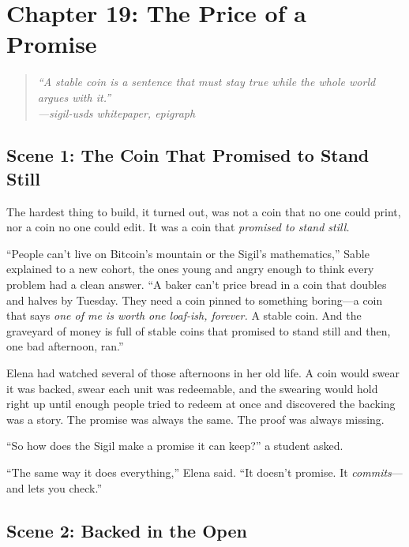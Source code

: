 \documentclass[12pt,letterpaper]{book}
\begin{document}
\hypertarget{chapter-19-the-price-of-a-promise}{%
\section{Chapter 19: The Price of a
Promise}\label{chapter-19-the-price-of-a-promise}}

\begin{quote}
\itshape ``A stable coin is a sentence that must stay true while the whole world
argues with it.''\\
\normalfont\hfill---sigil-usds whitepaper, epigraph
\end{quote}

\hypertarget{scene-1-the-coin-that-promised-to-stand-still}{%
\subsection{Scene 1: The Coin That Promised to Stand
Still}\label{scene-1-the-coin-that-promised-to-stand-still}}

The hardest thing to build, it turned out, was not a coin that no one could print,
nor a coin no one could edit. It was a coin that \emph{promised to stand still.}

``People can't live on Bitcoin's mountain or the Sigil's mathematics,'' Sable
explained to a new cohort, the ones young and angry enough to think every problem
had a clean answer. ``A baker can't price bread in a coin that doubles and halves
by Tuesday. They need a coin pinned to something boring---a coin that says
\emph{one of me is worth one loaf-ish, forever.} A stable coin. And the graveyard
of money is full of stable coins that promised to stand still and then, one bad
afternoon, ran.''

Elena had watched several of those afternoons in her old life. A coin would swear
it was backed, swear each unit was redeemable, and the swearing would hold right up
until enough people tried to redeem at once and discovered the backing was a story.
The promise was always the same. The proof was always missing.

``So how does the Sigil make a promise it can keep?'' a student asked.

``The same way it does everything,'' Elena said. ``It doesn't promise. It
\emph{commits}---and lets you check.''

\hypertarget{scene-2-backed-in-the-open}{%
\subsection{Scene 2: Backed in the
Open}\label{scene-2-backed-in-the-open}}
\end{document}
